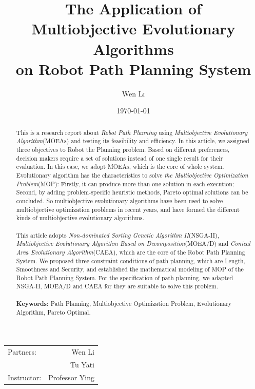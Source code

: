 \documentclass[a4paper, 11pt]{article}
\title{The Application of\\ Multiobjective Evolutionary Algorithms\\ on Robot Path Planning System} %
\author{Wen \textsc{Li}} %
\date{\today} %
\begin{document}
\maketitle %

\begin{center}
\begin{tabular}{l r}
Partners: & Wen Li \\ %
& Tu Yati\\
Instructor: & Professor Ying %
\end{tabular}
\end{center}


\begin{abstract}
\noindent This is a research report about \emph{Robot Path Planning} using \emph{Multiobjective Evolutionary Algorithm}(MOEAs)
and testing its feasibility and efficiency. In this article, we assigned three objectives to Robot the Planning problem.
Based on different preferences, decision makers require a set of solutions instead of one single result for their evaluation.
In this case, we adopt MOEAs, which is the core of whole system. Evolutionary algorithm has the characteristics to solve
\emph{the Multiobjective Optimization Problem}(MOP\cite{deb2001multi}): Firstly, it can produce more than one solution in each execution;
Second, by adding problem-specific heuristic methods, Pareto optimal solutions can be concluded.
So multiobjective evolutionary algorithms have been used to solve multiobjective optimization problems in recent years,
and have formed the different kinds of multiobjective evolutionary algorithms.\\
\\
This article adopts \emph{Non-dominated Sorting Genetic Algorithm II}(NSGA-II\cite{deb2000fast,deb2002fastelitist}),
\emph{Multiobjective Evolutionary Algorithm Based on Decomposition}(MOEA/D\cite{zhang2007moea}) and
\emph{Conical Area Evolutionary Algorithm}(CAEA\cite{weiqin2012efficient}), which are the core of the Robot Path Planning System.
We proposed three constraint conditions of path planning, which are Length, Smoothness and Security,
and established the mathematical modeling of MOP of the Robot Path Planning System.
For the specification of path planning, we adapted NSGA-II, MOEA/D and CAEA for they are suitable to solve this problem.\\
\\
\noindent \textbf{Keywords:} Path Planning, Multiobjective Optimization Problem, Evolutionary Algorithm, Pareto Optimal.
\newpage
\end{abstract}
\end{document}
